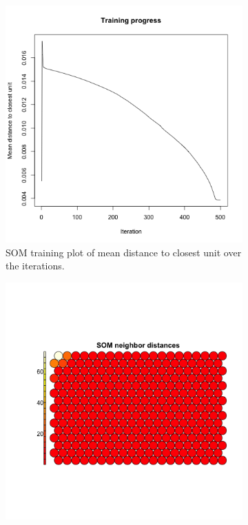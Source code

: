 \begin{figure}[t]
    \centering
    \begin{subfigure}[b]{0.4\textwidth}
        \centering
        \includegraphics[width=\textwidth]{../figs/transfer_training.png}
        \caption{SOM training plot of mean distance to closest unit over the iterations.}
        \label{fig:transfer-training}
    \end{subfigure}
    \begin{subfigure}[b]{0.4\textwidth}
        \centering
        \includegraphics[width=\textwidth]{../figs/transfer_U.png}

\end{subfigure}
\end{figure}
